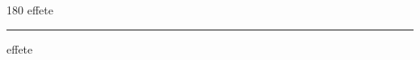 
\begin{frame}
\begin{center}
\begin{turn}{180}
{\fontsize{2.5cm}{1em}\selectfont effete}
\end{turn}
\vspace{1em}\par  
\hrule
\vspace{1em}\par  
{\fontsize{2.5cm}{1em}\selectfont effete}
\end{center}
\end{frame}
